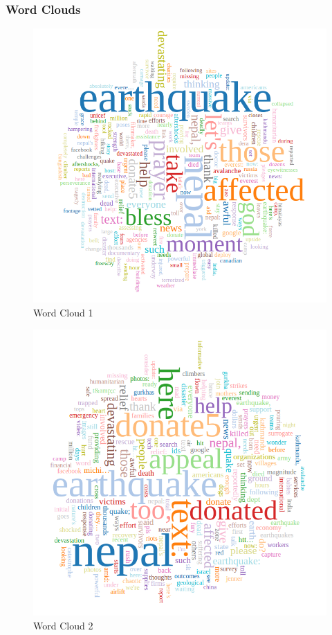 \begin{enumerate}
\subsubsection{Word Clouds}
\begin{figure}[ht]    
    \begin{center}
        \includegraphics[scale=0.40]{graphs/wc1.png}
        \caption{Word Cloud 1}
    \end{center}
\end{figure}

\newpage
\begin{figure}[ht]    
    \begin{center}
        \includegraphics[scale=0.40]{graphs/wc2.png}
        \caption{Word Cloud 2}
    \end{center}
\end{figure}


\end{enumerate}
